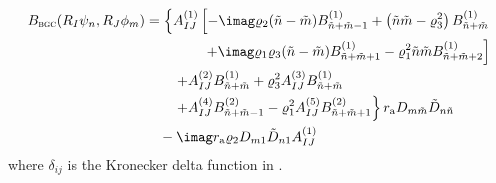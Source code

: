 \begin{equation}
\begin{aligned}
	B_{\textsc{bgc}}(R_I\psi_n,R_J\phi_m) 
	 &= \left\{A_{IJ}^{(1)}\left[-\imag\varrho_2(\tilde{n}-\tilde{m})B_{\tilde{n}+\tilde{m}-1}^{(1)} + \left(\tilde{n}\tilde{m}-\varrho_3^2\right)B_{\tilde{n}+\tilde{m}}^{(1)}\right. \right. \\
	  &{\hskip4em\relax}\left. \left. + \imag\varrho_1\varrho_3(\tilde{n}-\tilde{m})B_{\tilde{n}+\tilde{m}+1}^{(1)} - \varrho_1^2\tilde{n}\tilde{m}B_{\tilde{n}+\tilde{m}+2}^{(1)}\right] \right. \\
	 &{\hskip2em\relax}\left. +A_{IJ}^{(2)}B_{\tilde{n}+\tilde{m}}^{(1)} + \varrho_3^2A_{IJ}^{(3)} B_{\tilde{n}+\tilde{m}}^{(1)}\right.\\
	 &{\hskip2em\relax}\left. +A_{IJ}^{(4)}B_{\tilde{n}+\tilde{m}-1}^{(2)} -\varrho_1^2A_{IJ}^{(5)} B_{\tilde{n}+\tilde{m}+1}^{(2)}
	 \right\}r_{\mathrm{a}}D_{m\tilde{m}}\tilde{D}_{n\tilde{n}}\\
	 &\quad-\imag r_{\mathrm{a}}\varrho_2 D_{m1}\tilde{D}_{n1}A_{IJ}^{(1)} 
\end{aligned}
\end{equation}
where $\delta_{ij}$ is the Kronecker delta function in .